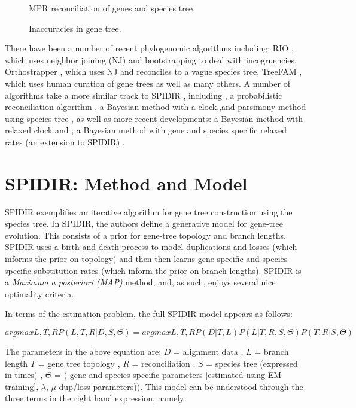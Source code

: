 \begin{figure} [ht!] 
  \centering 
  \caption{MPR reconciliation of genes and species tree.}
  \label{Fig18_AlternateReconciliations}
\end{figure} 

\begin{figure} [ht!] 
  \centering 
  \caption{Inaccuracies in gene tree.}
  \label{Fig19_GeneTreeInaccuracies}
\end{figure} 

There have been a number of recent phylogenomic algorithms including:
RIO \cite{Zmasek}, which uses neighbor joining (NJ) and bootstrapping
to deal with incogruencies, Orthostrapper \cite{Storm}, which uses NJ
and reconciles to a vague species tree, TreeFAM \cite{Li}, which uses
human curation of gene trees as well as many others. A number of
algorithms take a more similar track to SPIDIR \cite{Rasmussen},
including \cite{Arvestad}, a probabilistic reconciliation algorithm
\cite{Hollich}, a Bayesian method with a clock,\cite{Wapinski},and
parsimony method using species tree , as well as more recent
developments: \cite{Akerborg} a Bayesian method with relaxed clock and
\cite{Rasmussen2011}, a Bayesian method with gene and species specific
relaxed rates (an extension to SPIDIR) .

\section{SPIDIR: Method and Model} 
SPIDIR exemplifies an iterative algorithm for gene tree construction
using the species tree. In SPIDIR, the authors define a generative
model for gene-tree evolution. This consists of a prior for gene-tree
topology and branch lengths. SPIDIR uses a birth and death process to
model duplications and losses (which informs the prior on topology)
and then then learns gene-specific and species-specific substitution
rates (which inform the prior on branch lengths). SPIDIR is a
\textit{Maximum a posteriori (MAP)} method, and, as such, enjoys
several nice optimality criteria.

In terms of the estimation problem, the full SPIDIR model appears as
follows:

$argmax L,T,R P(L,T,R|D,S,\Theta) = argmax L,T,R P(D|T,L)P(L|T,R,S,\Theta)P(T,R|S,\Theta)$ 

The parameters in the above equation are: $D$ = alignment data , $L$ =
branch length $T$ = gene tree topology , $R$ = reconciliation , $S$ =
species tree (expressed in times) , $\Theta$ = ( gene and species
specific parameters [estimated using EM training], $\lambda$, $\mu$
dup/loss parameters)). This model can be understood through the three
terms in the right hand expression, namely:

